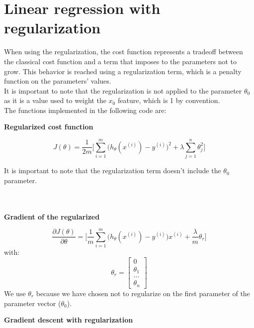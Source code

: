 \documentclass[11pt]{article}
\begin{document}
    \hypertarget{linear-regression-with-regularization}{%
\section{Linear regression with
regularization}\label{linear-regression-with-regularization}}

When using the regularization, the cost function represents a tradeoff between the classical cost function and a term that imposes to the parameters not to grow. This behavior is reached using a regularization term, which is a penalty function on the parameters' values.\\

It is important to note that the regularization is not applied to the parameter \(\theta_0\) as it is a value used to weight the \(x_0\) feature, which is 1 by convention.\\

The functions implemented in the following code are: \\
\begin{center}
    \textbf{{\Large Regularized cost function}} 
\end{center}

\[J(\theta)=\frac{1}{2m}\bigg[\sum_{i=1}^m\big(h_\theta(x^{(i)})-y^{(i)}\big)^2+\lambda \sum_{j=1}^n \theta_j^2\bigg] \]

It is important to note that the regularization term doesn't include the \(\theta_0\) parameter.\\ \\ \\
\begin{center}
    \textbf{{\Large Gradient of the regularized}} 
\end{center}

\[\frac{\partial J(\theta)}{\partial \theta} = \bigg[ \frac{1}{m}\sum_{i=1}^m\big(h_\theta(x^{(i)})-y^{(i)}\big)x^{(i)}+\frac{\lambda}{m} \theta_r\bigg] \]
with: \[\theta_r = \begin{bmatrix}
    0        \\
    \theta_1  \\
    \dots     \\
    \theta_n
\end{bmatrix}\] We use \(\theta_r\) because we have chosen not to
regularize on the first parameter of the parameter vector
(\(\theta_0\)).\\ 
\begin{center}
    \textbf{{\Large Gradient descent with regularization}} 
\end{center}
\end{document}
